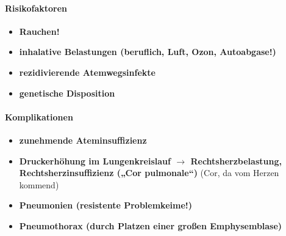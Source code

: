 		\paragraph{Risikofaktoren}
			\begin{itemize}
				\item \textbf{Rauchen!}
				\item \textbf{inhalative Belastungen (beruflich, Luft, Ozon, Autoabgase!)}
				\item \textbf{rezidivierende Atemwegsinfekte}
				\item \textbf{genetische Disposition}
			\end{itemize}
		\paragraph{Komplikationen}
			\begin{itemize}
				\item \textbf{zunehmende Ateminsuffizienz}
				\item \textbf{Druckerhöhung im Lungenkreislauf $\rightarrow$ Rechtsherzbelastung, Rechtsherzinsuffizienz („Cor pulmonale“)} (Cor, da vom Herzen kommend)
				\item \textbf{Pneumonien (resistente Problemkeime!)}
				\item \textbf{Pneumothorax (durch Platzen einer großen Emphysemblase)}
			\end{itemize}
